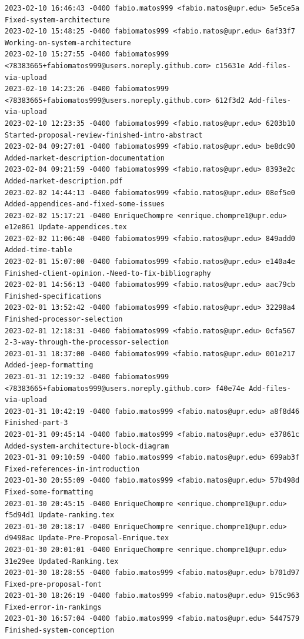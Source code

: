 \documentclass[12pt]{article}
\begin{document}
\begin{verbatim}
2023-02-10 16:46:43 -0400 fabio.matos999 <fabio.matos@upr.edu> 5e5ce5a Fixed-system-architecture
2023-02-10 15:48:25 -0400 fabiomatos999 <fabio.matos@upr.edu> 6af33f7 Working-on-system-architecture
2023-02-10 15:27:55 -0400 fabiomatos999 <78383665+fabiomatos999@users.noreply.github.com> c15631e Add-files-via-upload
2023-02-10 14:23:26 -0400 fabiomatos999 <78383665+fabiomatos999@users.noreply.github.com> 612f3d2 Add-files-via-upload
2023-02-10 12:23:35 -0400 fabiomatos999 <fabio.matos@upr.edu> 6203b10 Started-proposal-review-finished-intro-abstract
2023-02-04 09:27:01 -0400 fabiomatos999 <fabio.matos@upr.edu> be8dc90 Added-market-description-documentation
2023-02-04 09:21:59 -0400 fabiomatos999 <fabio.matos@upr.edu> 8393e2c Added-market-description.pdf
2023-02-02 14:44:13 -0400 fabiomatos999 <fabio.matos@upr.edu> 08ef5e0 Added-appendices-and-fixed-some-issues
2023-02-02 15:17:21 -0400 EnriqueChompre <enrique.chompre1@upr.edu> e12e861 Update-appendices.tex
2023-02-02 11:06:40 -0400 fabiomatos999 <fabio.matos@upr.edu> 849add0 Added-time-table
2023-02-01 15:07:00 -0400 fabiomatos999 <fabio.matos@upr.edu> e140a4e Finished-client-opinion.-Need-to-fix-bibliography
2023-02-01 14:56:13 -0400 fabiomatos999 <fabio.matos@upr.edu> aac79cb Finished-specifications
2023-02-01 13:52:42 -0400 fabiomatos999 <fabio.matos@upr.edu> 32298a4 Finished-processor-selection
2023-02-01 12:18:31 -0400 fabiomatos999 <fabio.matos@upr.edu> 0cfa567 2-3-way-through-the-processor-selection
2023-01-31 18:37:00 -0400 fabiomatos999 <fabio.matos@upr.edu> 001e217 Added-jeep-formatting
2023-01-31 12:19:32 -0400 fabiomatos999 <78383665+fabiomatos999@users.noreply.github.com> f40e74e Add-files-via-upload
2023-01-31 10:42:19 -0400 fabio.matos999 <fabio.matos@upr.edu> a8f8d46 Finished-part-3
2023-01-31 09:45:14 -0400 fabio.matos999 <fabio.matos@upr.edu> e37861c Added-system-architecture-block-diagram
2023-01-31 09:10:59 -0400 fabio.matos999 <fabio.matos@upr.edu> 699ab3f Fixed-references-in-introduction
2023-01-30 20:55:09 -0400 fabio.matos999 <fabio.matos@upr.edu> 57b498d Fixed-some-formatting
2023-01-30 20:45:15 -0400 EnriqueChompre <enrique.chompre1@upr.edu> f5d94d1 Update-ranking.tex
2023-01-30 20:18:17 -0400 EnriqueChompre <enrique.chompre1@upr.edu> d9498ac Update-Pre-Proposal-Enrique.tex
2023-01-30 20:01:01 -0400 EnriqueChompre <enrique.chompre1@upr.edu> 31e29ee Updated-Ranking.tex
2023-01-30 18:28:55 -0400 fabio.matos999 <fabio.matos@upr.edu> b701d97 Fixed-pre-proposal-font
2023-01-30 18:26:19 -0400 fabio.matos999 <fabio.matos@upr.edu> 915c963 Fixed-error-in-rankings
2023-01-30 16:57:04 -0400 fabio.matos999 <fabio.matos@upr.edu> 5447579 Finished-system-conception

\end{verbatim}
\end{document}
